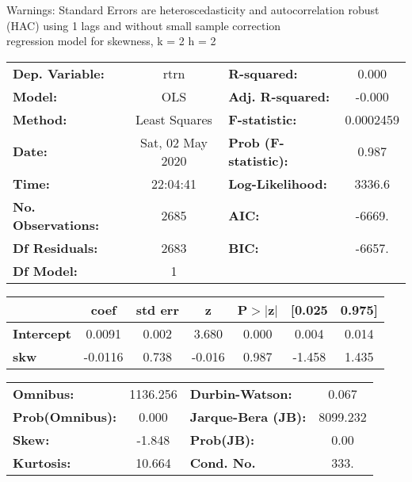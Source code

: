 Warnings: \newline
 [1] Standard Errors are heteroscedasticity and autocorrelation robust (HAC) using 1 lags and without small sample correction\\ 

regression model for skewness, k = 2 h = 2\begin{center}
\begin{tabular}{lclc}
\toprule
\textbf{Dep. Variable:}    &       rtrn       & \textbf{  R-squared:         } &     0.000   \\
\textbf{Model:}            &       OLS        & \textbf{  Adj. R-squared:    } &    -0.000   \\
\textbf{Method:}           &  Least Squares   & \textbf{  F-statistic:       } & 0.0002459   \\
\textbf{Date:}             & Sat, 02 May 2020 & \textbf{  Prob (F-statistic):} &    0.987    \\
\textbf{Time:}             &     22:04:41     & \textbf{  Log-Likelihood:    } &    3336.6   \\
\textbf{No. Observations:} &        2685      & \textbf{  AIC:               } &    -6669.   \\
\textbf{Df Residuals:}     &        2683      & \textbf{  BIC:               } &    -6657.   \\
\textbf{Df Model:}         &           1      & \textbf{                     } &             \\
\bottomrule
\end{tabular}
\begin{tabular}{lcccccc}
                   & \textbf{coef} & \textbf{std err} & \textbf{z} & \textbf{P$> |$z$|$} & \textbf{[0.025} & \textbf{0.975]}  \\
\midrule
\textbf{Intercept} &       0.0091  &        0.002     &     3.680  &         0.000        &        0.004    &        0.014     \\
\textbf{skw}       &      -0.0116  &        0.738     &    -0.016  &         0.987        &       -1.458    &        1.435     \\
\bottomrule
\end{tabular}
\begin{tabular}{lclc}
\textbf{Omnibus:}       & 1136.256 & \textbf{  Durbin-Watson:     } &    0.067  \\
\textbf{Prob(Omnibus):} &   0.000  & \textbf{  Jarque-Bera (JB):  } & 8099.232  \\
\textbf{Skew:}          &  -1.848  & \textbf{  Prob(JB):          } &     0.00  \\
\textbf{Kurtosis:}      &  10.664  & \textbf{  Cond. No.          } &     333.  \\
\bottomrule
\end{tabular}
\end{center}

